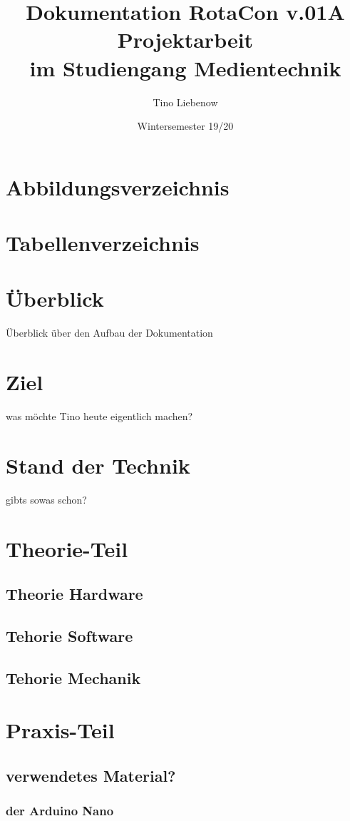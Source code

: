 \documentclass[a4paper, twoside, 10pt]{article}
\title{
	\Huge Dokumentation RotaCon v.01A
	\\
	\Large Projektarbeit 
	\\
	im Studiengang Medientechnik}
\author{Tino Liebenow}
\date{Wintersemester 19/20}
\begin{document}
	\maketitle
	\newpage
	\tableofcontents
	\newpage
	\section*{Abbildungsverzeichnis}
	\newpage
	\section*{Tabellenverzeichnis}
	\newpage
	\section{Überblick}
		Überblick über den Aufbau der Dokumentation
	\section{Ziel}
		was möchte Tino heute eigentlich machen? 
	\section{Stand der Technik}	
		gibts sowas schon?
	\section{Theorie-Teil}
		\subsection{Theorie Hardware}
		\subsection{Tehorie Software}
		\subsection{Tehorie Mechanik}
	\section{Praxis-Teil}
		\subsection{verwendetes Material?}
			\subsubsection{der Arduino Nano}
\end{document}

